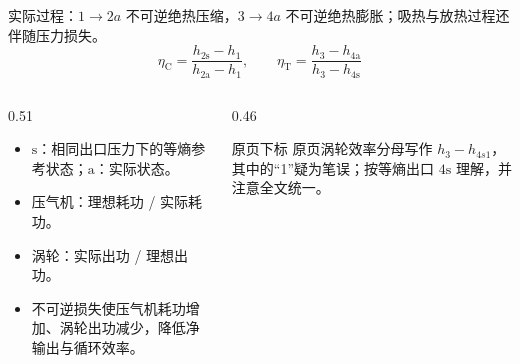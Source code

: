 \begin{frame}[t,shrink]{}
实际过程：\(1\to2a\) 不可逆绝热压缩，\(3\to4a\) 不可逆绝热膨胀；吸热与放热过程还伴随压力损失。
$$
\eta_{\mathrm{C}}
=\frac{h_{2\mathrm{s}}-h_1}{h_{2\mathrm{a}}-h_1},
\qquad
\eta_{\mathrm{T}}
=\frac{h_3-h_{4\mathrm{a}}}{h_3-h_{4\mathrm{s}}}
$$
\begin{columns}[T,onlytextwidth]
\begin{column}{0.51\textwidth}
  \begin{itemize}
    \item \(\mathrm{s}\)：相同出口压力下的等熵参考状态；\(\mathrm{a}\)：实际状态。
    \item 压气机：理想耗功 / 实际耗功。
    \item 涡轮：实际出功 / 理想出功。
    \item 不可逆损失使压气机耗功增加、涡轮出功减少，降低净输出与循环效率。
  \end{itemize}
\end{column}
\begin{column}{0.46\textwidth}
  \begin{amberbox}{原页下标}
  \small 原页涡轮效率分母写作 \(h_3-h_{4s1}\)，其中的“1”疑为笔误；按等熵出口 \(4\mathrm{s}\) 理解，并注意全文统一。
  \end{amberbox}
\end{column}
\end{columns}
\end{frame}

